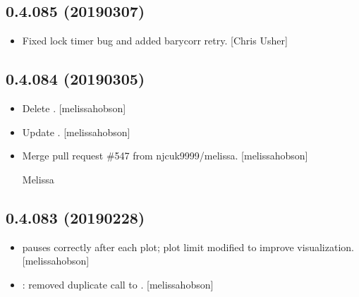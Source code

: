 \documentclass[a4paper,10pt,english]{report}
\begin{document}
\subsection{0.4.085 (2019\sphinxhyphen{}03\sphinxhyphen{}07)}
\label{\detokenize{misc/changelog:id195}}\begin{itemize}
\item {} 
Fixed lock timer bug and added barycorr retry. {[}Chris Usher{]}

\end{itemize}


\subsection{0.4.084 (2019\sphinxhyphen{}03\sphinxhyphen{}05)}
\label{\detokenize{misc/changelog:id196}}\begin{itemize}
\item {} 
Delete . {[}melissa\sphinxhyphen{}hobson{]}

\item {} 
Update . {[}melissa\sphinxhyphen{}hobson{]}

\item {} 
Merge pull request \#547 from njcuk9999/melissa. {[}melissa\sphinxhyphen{}hobson{]}

Melissa

\end{itemize}


\subsection{0.4.083 (2019\sphinxhyphen{}02\sphinxhyphen{}28)}
\label{\detokenize{misc/changelog:id197}}\begin{itemize}
\item {} 
 pauses correctly after each plot;
plot limit modified to improve visualization. {[}melissa\sphinxhyphen{}hobson{]}

\item {} 
: removed
duplicate call to . {[}melissa\sphinxhyphen{}hobson{]}

\end{itemize}
\end{document}
